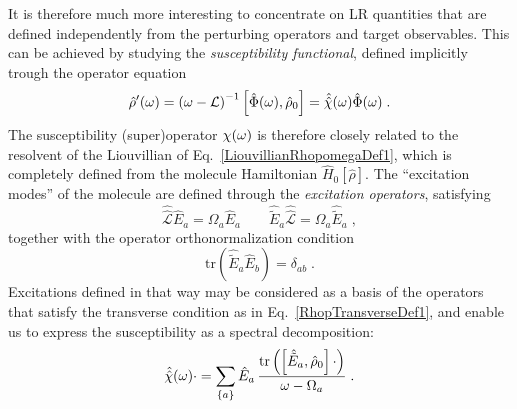 \documentclass[reprint,aps,prb]{revtex4-1}
\newcommand{\be}{\begin{equation}}
\newcommand{\ee}{\end{equation}}
\newcommand{\qq}{\qquad}
\newcommand{\lb}{\label}
\newcommand{\op}[1]{\hat {#1}}
\newcommand{\sop}[1]{\op{\op {#1}}}
\newcommand{\commutator}[2]{\left[ {#1} , {#2} \right]}
\newcommand{\trace}[1]{\mathrm{tr}\left(#1\right)}
\newcommand{\dmnot}{\op{\rho}_0}
\newcommand{\dm}{\op{\rho}}
\newcommand{\hnot}{\op{H}_0}
\newcommand{\Liouv}{\sop{\mathcal L}}
\begin{document}
It is therefore much more interesting to concentrate on LR quantities that are defined independently from the perturbing operators and target observables.
This can be achieved by studying the
\emph{susceptibility functional}, defined implicitly trough the operator equation
\be\lb{SusceptibilityDef1}
\dm'(\omega) = \left(\omega -\mathcal L \right)^{-1} \commutator{\op \Phi(\omega)}{\dmnot} = \sop{{\cal \chi}}(\omega) \op\Phi(\omega) \;.
\ee
The susceptibility (super)operator $\cal \chi(\omega)$ is therefore closely related to the resolvent of the Liouvillian of Eq.~\eqref{LiouvillianRhopomegaDef1}, which is completely defined
from the molecule Hamiltonian $\hnot[\dm]$.
The ``excitation modes''  of the molecule are defined through the \emph{excitation operators}, satisfying
\be\lb{ExcitationOperatorsDef1}
\Liouv \op E_a = \Omega_a \op E_a \qq \op{\tilde E}_a \Liouv = \Omega_a \op{\tilde E}_a \;,
\ee
together with the operator orthonormalization condition %
\be\lb{orthoExcitatioOpDef1}
\trace{\op{\tilde E}_a\op E_b} = \delta_{ab} \;.
\ee
Excitations defined in that way may be considered as a basis of the operators that satisfy the transverse condition as in
Eq.~\eqref{RhopTransverseDef1}, and enable us to express the susceptibility as a spectral decomposition:
\be\lb{RhopExcitationDef1}
\sop{{\cal \chi}}(\omega) \cdot   = \sum_{\{a\}} \op E_{a} \,
\frac{\trace{\commutator{\op{\tilde E}_a}{\dmnot}\cdot}}{\omega-\Omega_a} \;.
\ee
\end{document}

